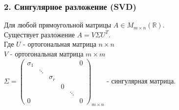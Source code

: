 \documentclass[12pt, letterpaper, twoside]{article}
\begin{document}
\subsubsection*{2. Сингулярное разложение (SVD)}
Для любой прямоугольной матрицы $A \in M_{m\times n}(\mathbb{R})$.\\
Существует разложение $A = V\Sigma U^T$.\\
Где $U$ - ортогональная матрица $n\times n$\\
$V$ - ортогональная матрица $m\times m$\\
$\Sigma = \begin{pmatrix}
    \sigma_1 & & & & & 0\\
    & \ddots\\
    & & \sigma_r\\
    & & & 0\\
    & & & & \ddots\\
    0& & & & & 0
\end{pmatrix}_{m\times n}$ - сингулярная матрица.
\end{document}
